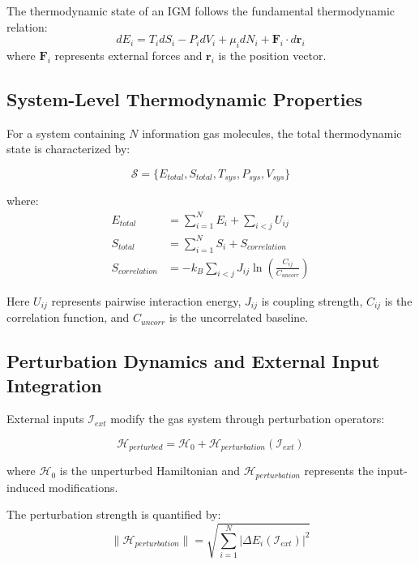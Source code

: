 \documentclass[11pt,a4paper]{article}
\begin{document}
The thermodynamic state of an IGM follows the fundamental thermodynamic relation:
\begin{equation}
dE_i = T_i dS_i - P_i dV_i + \mu_i dN_i + \mathbf{F}_i \cdot d\mathbf{r}_i
\end{equation}
where $\mathbf{F}_i$ represents external forces and $\mathbf{r}_i$ is the position vector.

\subsection{System-Level Thermodynamic Properties}

For a system containing $N$ information gas molecules, the total thermodynamic state is characterized by:

\begin{equation}
\mathcal{S} = \{E_{total}, S_{total}, T_{sys}, P_{sys}, V_{sys}\}
\end{equation}

where:
\begin{align}
E_{total} &= \sum_{i=1}^{N} E_i + \sum_{i<j} U_{ij} \\
S_{total} &= \sum_{i=1}^{N} S_i + S_{correlation} \\
S_{correlation} &= -k_B \sum_{i<j} J_{ij} \ln\left(\frac{C_{ij}}{C_{uncorr}}\right)
\end{align}

Here $U_{ij}$ represents pairwise interaction energy, $J_{ij}$ is coupling strength, $C_{ij}$ is the correlation function, and $C_{uncorr}$ is the uncorrelated baseline.

\subsection{Perturbation Dynamics and External Input Integration}

External inputs $\mathcal{I}_{ext}$ modify the gas system through perturbation operators:

\begin{equation}
\mathcal{H}_{perturbed} = \mathcal{H}_0 + \mathcal{H}_{perturbation}(\mathcal{I}_{ext})
\end{equation}

where $\mathcal{H}_0$ is the unperturbed Hamiltonian and $\mathcal{H}_{perturbation}$ represents the input-induced modifications.

The perturbation strength is quantified by:
\begin{equation}
\|\mathcal{H}_{perturbation}\| = \sqrt{\sum_{i=1}^{N} \left|\Delta E_i(\mathcal{I}_{ext})\right|^2}
\end{equation}
\end{document}
